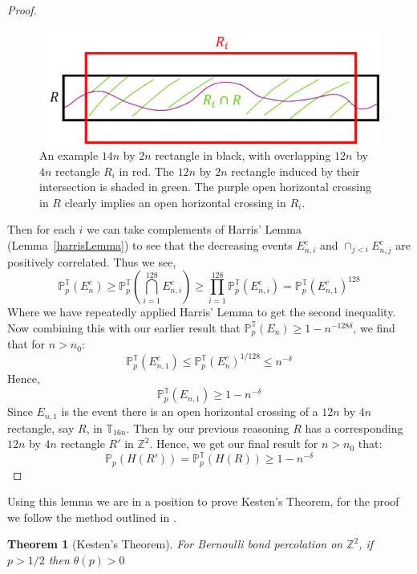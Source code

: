 \documentclass[a4paper,11pt]{article}
\newtheorem{theorem}{Theorem}[section]
\theoremstyle{definition}
\newcommand{\ints}{\mathbb{Z}}
\newcommand{\prob}{\mathbb{P}_p}
\newcommand{\probtorus}{\mathbb{P}^{\mathbb{T}}_{p}}
\begin{document}
\begin{proof}
	\begin{figure}
		\centering
		\includegraphics[scale=0.8]{drawings/rectangleOverlap.png}
		\caption{An example $14n$ by $2n$ rectangle in black, with overlapping $12n$ by $4n$ rectangle $R_i$ in red. The $12n$ by $2n$ rectangle induced by their intersection is shaded in green. The purple open horizontal crossing in $R$ clearly implies an open horizontal crossing in $R_i$.}
		\label{fig:rectangleOverlap}
	\end{figure}

	Then for each $i$ we can take complements of Harris' Lemma (Lemma~\ref*{harrisLemma}) to see that the decreasing events $E^c_{n,i}$ and $\cap_{j<i}E^c_{n,j}$ are positively correlated. Thus we see,
	$$\probtorus(E^c_n) \geq \probtorus\left(\bigcap^{128}_{i=1}E^c_{n,i}\right) \geq \prod_{i=1}^{128}\probtorus(E^c_{n,i}) = \probtorus(E^c_{n,1})^{128}$$
	Where we have repeatedly applied Harris' Lemma to get the second inequality.
	Now combining this with our earlier result that $\probtorus(E_n) \geq 1-n^{-128 \delta}$, we find that for $n> n_0$:
	$$\probtorus(E_{n,1}^c) \leq \probtorus(E_n^c)^{1/128} \leq n^{- \delta}$$
	Hence,
	$$\probtorus(E_{n,1}) \geq 1- n^{- \delta}$$
	Since $E_{n,1}$ is the event there is an open horizontal crossing of a $12n$ by $4n$ rectangle, say $R$, in $\mathbb{T}_{16n}$. Then by our previous reasoning $R$ has a corresponding $12n$ by $4n$ rectangle $R'$ in $\ints^2$. 
	Hence, we get our final result for $n>n_0$ that:
	$$\prob(H(R')) = \probtorus(H(R)) \geq 1-n^{-\delta}$$
\end{proof}

Using this lemma we are in a position to prove Kesten's Theorem, for the proof we follow the method outlined in \cite{bollo2006}.

\begin{theorem}[Kesten's Theorem]
	For Bernoulli bond percolation on $\ints^2$, if $p>1/2$ then $\theta(p) > 0$
\end{theorem}
\end{document}
